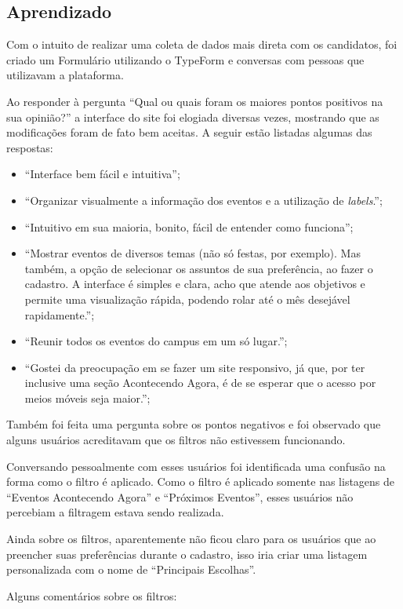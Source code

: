 \subsection{Aprendizado}
\par Com o intuito de realizar uma coleta de dados mais direta com os candidatos, foi criado um Formulário utilizando o TypeForm e conversas com pessoas que utilizavam a plataforma.
\par Ao responder à pergunta ``Qual ou quais foram os maiores pontos positivos na sua opinião?'' a interface do site foi elogiada diversas vezes, mostrando que as modificações foram de fato bem aceitas. A seguir estão listadas algumas das respostas:
\begin{itemize}
\item ``Interface bem fácil e intuitiva'';
\item ``Organizar visualmente a informação dos eventos e a utilização de \emph{labels}.'';
\item ``Intuitivo em sua maioria, bonito, fácil de entender como funciona'';
\item ``Mostrar eventos de diversos temas (não só festas, por exemplo). Mas também, a
opção de selecionar os assuntos de sua preferência, ao fazer o cadastro. A interface é simples e clara, acho que atende aos objetivos e permite uma visualização rápida, podendo rolar até o mês desejável rapidamente.'';
\item ``Reunir todos os eventos do campus em um só lugar.'';
\item ``Gostei da preocupação em se fazer um site responsivo, já que, por ter inclusive uma seção Acontecendo Agora, é de se esperar que o acesso por meios móveis seja maior.'';
\end{itemize}
\par Também foi feita uma pergunta sobre os pontos negativos e foi observado que alguns usuários acreditavam que os filtros não estivessem funcionando.
\par Conversando pessoalmente com esses usuários foi identificada uma confusão na forma como o filtro é aplicado. Como o filtro é aplicado somente nas listagens de ``Eventos Acontecendo Agora'' e ``Próximos Eventos'', esses usuários não percebiam a filtragem estava sendo realizada.
\par Ainda sobre os filtros, aparentemente não ficou claro para os usuários que ao preencher suas preferências durante o cadastro, isso iria criar uma listagem personalizada com o nome de ``Principais Escolhas''.
\par Alguns comentários sobre os filtros:
